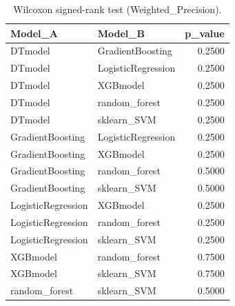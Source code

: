 \begin{table}[t]
\centering
\begin{tabular}{llr}
\toprule
Model_A & Model_B & p_value \\
\midrule
DTmodel & GradientBoosting & 0.2500 \\
DTmodel & LogisticRegression & 0.2500 \\
DTmodel & XGBmodel & 0.2500 \\
DTmodel & random_forest & 0.2500 \\
DTmodel & sklearn_SVM & 0.2500 \\
GradientBoosting & LogisticRegression & 0.2500 \\
GradientBoosting & XGBmodel & 0.2500 \\
GradientBoosting & random_forest & 0.5000 \\
GradientBoosting & sklearn_SVM & 0.5000 \\
LogisticRegression & XGBmodel & 0.2500 \\
LogisticRegression & random_forest & 0.2500 \\
LogisticRegression & sklearn_SVM & 0.2500 \\
XGBmodel & random_forest & 0.7500 \\
XGBmodel & sklearn_SVM & 0.7500 \\
random_forest & sklearn_SVM & 0.5000 \\
\bottomrule
\end{tabular}
\caption{Wilcoxon signed-rank test (Weighted_Precision).}
\label{tab:wilcoxon_Weighted_Precision}
\end{table}